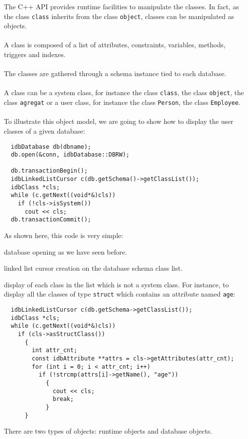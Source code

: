 The \eyedb C++ API provides runtime facilities to manipulate the \eyedb
classes. In fact, as the class \texttt{class} inherits from the
class \texttt{object}, \eyedb classes can be manipulated as objects.
\\
\\
A class is composed of a list of attributes, constraints,
variables, methods, triggers and indexes.
\\
\\
The classes are gathered through a schema instance tied to
each database.
\\
\\
A class can be a system class, for instance the class \texttt{class}, the
class \texttt{object}, the class \texttt{agregat} or a user class, for
instance the class \texttt{Person}, the class \texttt{Employee}.
\\
\\
To illustrate this object model, we are going to show how to display the
user classes of a given database:
\verbsize
\begin{verbatim}
  idbDatabase db(dbname);
  db.open(&conn, idbDatabase::DBRW);

  db.transactionBegin();
  idbLinkedListCursor c(db.getSchema()->getClassList());
  idbClass *cls;
  while (c.getNext((void*&)cls))
    if (!cls->isSystem())
      cout << cls;
  db.transactionCommit();
\end{verbatim}
\normalsize
As shown here, this code is very simple:
\be
\item database opening as we have seen before.
\item linked list cursor creation on the database schema class list.
\item display of each class in the list which is not a system class.
\ee
For instance, to display all the classes of type \texttt{struct} which contains
an attribute named \texttt{age}:
\verbsize
\begin{verbatim}
  idbLinkedListCursor c(db.getSchema->getClassList());
  idbClass *cls;
  while (c.getNext((void*&)cls))
    if (cls->asStructClass())
      {
        int attr_cnt;
        const idbAttribute **attrs = cls->getAttributes(attr_cnt);
        for (int i = 0; i < attr_cnt; i++)
          if (!strcmp(attrs[i]->getName(), "age"))
            {
              cout << cls;
              break;
            }
      }
\end{verbatim}
\normalsize
{}
There are two types of objects: runtime objects and database objects.
